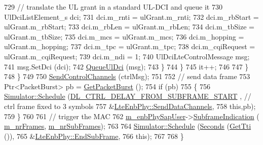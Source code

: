 \begin{DoxyCode}
729                   \textcolor{comment}{// translate the UL grant in a standard UL-DCI and queue it}
730                   UlDciListElement\_s dci;
731                   dci.m\_rnti = ulGrant.m\_rnti;
732                   dci.m\_rbStart = ulGrant.m\_rbStart;
733                   dci.m\_rbLen = ulGrant.m\_rbLen;
734                   dci.m\_tbSize = ulGrant.m\_tbSize;
735                   dci.m\_mcs = ulGrant.m\_mcs;
736                   dci.m\_hopping = ulGrant.m\_hopping;
737                   dci.m\_tpc = ulGrant.m\_tpc;
738                   dci.m\_cqiRequest = ulGrant.m\_cqiRequest;
739                   dci.m\_ndi = 1;
740                   UlDciLteControlMessage msg;
741                   msg.SetDci (dci);
742                   \hyperlink{classns3_1_1LteEnbPhy_a95bdedc1bcc58b79f4d1e26080cdf3f2}{QueueUlDci} (msg);
743                 \}
744             \}
745           it++;
746 
747         \}
748     \}
749 
750   \hyperlink{classns3_1_1LteEnbPhy_a9b09d7774432283838c76d867a814b13}{SendControlChannels} (ctrlMsg);
751 
752   \textcolor{comment}{// send data frame}
753   Ptr<PacketBurst> pb = \hyperlink{classns3_1_1LtePhy_a832e7a5c99c59e5ee23cbd6e748400e0}{GetPacketBurst} ();
754   \textcolor{keywordflow}{if} (pb)
755     \{
756       \hyperlink{classns3_1_1Simulator_a671882c894a08af4a5e91181bf1eec13}{Simulator::Schedule} (\hyperlink{namespacens3_a1c291c1be200321560d497ca4ca37247}{DL\_CTRL\_DELAY\_FROM\_SUBFRAME\_START}
      , \textcolor{comment}{// ctrl frame fixed to 3 symbols}
757                            &\hyperlink{classns3_1_1LteEnbPhy_a5dec1aaf78faa0221eeda08f8e0fa1b0}{LteEnbPhy::SendDataChannels},
758                            \textcolor{keyword}{this},pb);
759     \}
760 
761   \textcolor{comment}{// trigger the MAC}
762   \hyperlink{classns3_1_1LteEnbPhy_a731048734464383920acca0e20a1f020}{m\_enbPhySapUser}->\hyperlink{classns3_1_1LteEnbPhySapUser_ae8ea02073c0d926e3cc37bdc4e5a1cd4}{SubframeIndication} (
      \hyperlink{classns3_1_1LteEnbPhy_ae8464d0dff85be592774739e81f28942}{m\_nrFrames}, \hyperlink{classns3_1_1LteEnbPhy_a21c4d540ccd4813df02001a5e0159a35}{m\_nrSubFrames});
763 
764   \hyperlink{classns3_1_1Simulator_a671882c894a08af4a5e91181bf1eec13}{Simulator::Schedule} (\hyperlink{group__timecivil_ga33c34b816f8ff6628e33d5c8e9713b9e}{Seconds} (\hyperlink{classns3_1_1LtePhy_ae52a0e549222666b7ce09b83f8a6c589}{GetTti} ()),
765                        &\hyperlink{classns3_1_1LteEnbPhy_ac116fed9becb5dd146dc2c8b7fedfc58}{LteEnbPhy::EndSubFrame},
766                        \textcolor{keyword}{this});
767 
768 \}
\end{DoxyCode}


